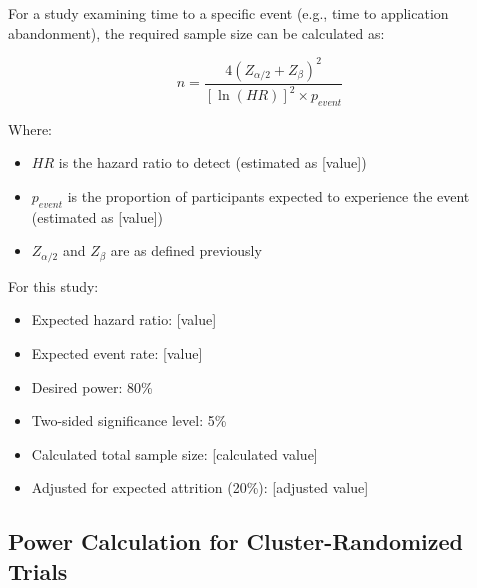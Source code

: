 \begin{tcolorbox}[title=Sample Size Calculation for Time-to-Event Outcome]
For a study examining time to a specific event (e.g., time to application abandonment), the required sample size can be calculated as:

\begin{equation}
n = \frac{4 (Z_{\alpha/2} + Z_{\beta})^2}{[\ln(HR)]^2 \times p_{event}}
\end{equation}

Where:
\begin{itemize}
    \item $HR$ is the hazard ratio to detect (estimated as [value])
    \item $p_{event}$ is the proportion of participants expected to experience the event (estimated as [value])
    \item $Z_{\alpha/2}$ and $Z_{\beta}$ are as defined previously
\end{itemize}

For this study:
\begin{itemize}
    \item Expected hazard ratio: [value]
    \item Expected event rate: [value]
    \item Desired power: 80\%
    \item Two-sided significance level: 5\%
    \item Calculated total sample size: [calculated value]
    \item Adjusted for expected attrition (20\%): [adjusted value]
\end{itemize}
\end{tcolorbox}

\subsection{Power Calculation for Cluster-Randomized Trials}

